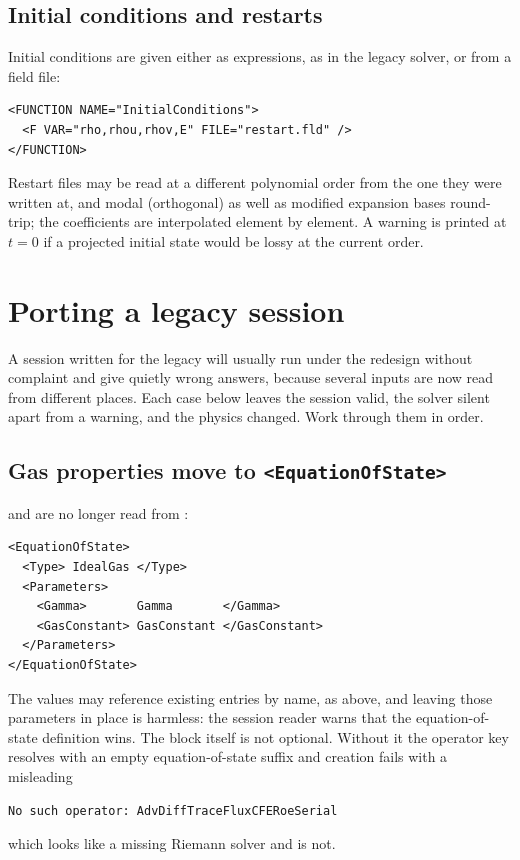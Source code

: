 \subsection*{Initial conditions and restarts}
Initial conditions are given either as expressions, as in the legacy
solver, or from a field file:
\begin{lstlisting}[style=XmlStyle]
<FUNCTION NAME="InitialConditions">
  <F VAR="rho,rhou,rhov,E" FILE="restart.fld" />
</FUNCTION>
\end{lstlisting}
Restart files may be read at a different polynomial order from the one
they were written at, and modal (orthogonal) as well as modified expansion
bases round-trip; the coefficients are interpolated element by element. A
warning is printed at $t=0$ if a projected initial state would be lossy at
the current order.

\section{Porting a legacy session}
A session written for the legacy  will usually
run under the redesign without complaint and give quietly wrong answers,
because several inputs are now read from different places. Each case below
leaves the session valid, the solver silent apart from a warning, and the
physics changed. Work through them in order.

\subsection*{Gas properties move to \texttt{<EquationOfState>}}
 and  are no longer read from
:
\begin{lstlisting}[style=XmlStyle]
<EquationOfState>
  <Type> IdealGas </Type>
  <Parameters>
    <Gamma>       Gamma       </Gamma>
    <GasConstant> GasConstant </GasConstant>
  </Parameters>
</EquationOfState>
\end{lstlisting}
The values may reference existing  entries by name, as
above, and leaving those parameters in place is harmless: the session reader
warns that the equation-of-state definition wins. The block itself is not
optional. Without it the operator key resolves with an empty
equation-of-state suffix and creation fails with a misleading
\begin{lstlisting}[style=BashInputStyle]
No such operator: AdvDiffTraceFluxCFERoeSerial
\end{lstlisting}
which looks like a missing Riemann solver and is not.

